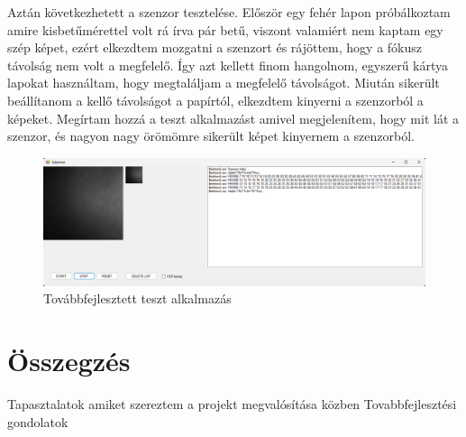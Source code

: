 \documentclass[]{thesis-ekf}
\theoremstyle{definition}
\theoremstyle{remark}
\begin{document}
Aztán következhetett a szenzor tesztelése. Először egy fehér lapon próbálkoztam amire kisbetűmérettel volt rá írva pár betű, viszont valamiért nem kaptam egy szép képet, ezért elkezdtem mozgatni a szenzort és rájöttem, hogy a fókusz távolság nem volt a megfelelő. Így azt kellett finom hangolnom, egyszerű kártya lapokat használtam, hogy megtaláljam a megfelelő távolságot. Miután sikerült beállítanom a kellő távolságot a papírtól, elkezdtem kinyerni a szenzorból a képeket. Megírtam hozzá a teszt alkalmazást amivel megjelenítem, hogy mit lát a szenzor, és nagyon nagy örömömre sikerült képet kinyernem a szenzorból.
\begin{figure}[th!]
	\centering
	\includegraphics[width=1\linewidth]{tesztalkalmazas2}
	\caption[Teszt2]{Továbbfejlesztett teszt alkalmazás}
	\label{fig:tesztalkalmazas2}
\end{figure}

\chapter*{Összegzés}
Tapasztalatok amiket szereztem a projekt megvalósítása közben
Tovabbfejlesztési gondolatok

\end{document}
